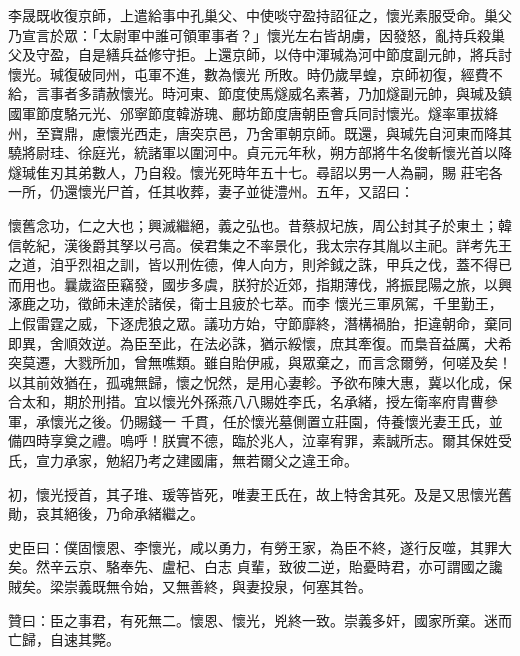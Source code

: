 \begin{pinyinscope}
 李晟既收復京師，上遣給事中孔巢父、中使啖守盈持詔征之，懷光素服受命。巢父乃宣言於眾：「太尉軍中誰可領軍事者？」懷光左右皆胡虜，因發怒，亂持兵殺巢父及守盈，自是繕兵益修守拒。上還京師，以侍中渾瑊為河中節度副元帥，將兵討懷光。瑊復破同州，屯軍不進，數為懷光
 所敗。時仍歲旱蝗，京師初復，經費不給，言事者多請赦懷光。時河東、節度使馬燧威名素著，乃加燧副元帥，與瑊及鎮國軍節度駱元光、邠寧節度韓游瑰、鄜坊節度唐朝臣會兵同討懷光。燧率軍拔絳州，至寶鼎，慮懷光西走，唐突京邑，乃舍軍朝京師。既還，與瑊先自河東而降其驍將尉珪、徐庭光，統諸軍以圍河中。貞元元年秋，朔方部將牛名俊斬懷光首以降燧瑊隹刃其弟數人，乃自殺。懷光死時年五十七。尋詔以男一人為嗣，賜
 莊宅各一所，仍還懷光尸首，任其收葬，妻子並徙澧州。五年，又詔曰：



 懷舊念功，仁之大也；興滅繼絕，義之弘也。昔蔡叔圮族，周公封其子於東土；韓信乾紀，漢後爵其孥以弓高。侯君集之不率景化，我太宗存其胤以主祀。詳考先王之道，洎乎烈祖之訓，皆以刑佐德，俾人向方，則斧鉞之誅，甲兵之伐，蓋不得已而用也。曩歲盜臣竊發，國步多虞，朕狩於近郊，指期薄伐，將振昆陽之旅，以興涿鹿之功，徵師未達於諸侯，衛士且疲於七萃。而李
 懷光三軍夙駕，千里勤王，上假雷霆之威，下逐虎狼之眾。議功方始，守節靡終，潛構禍胎，拒違朝命，棄同即異，舍順效逆。為臣至此，在法必誅，猶示綏懷，庶其牽復。而梟音益厲，犬希突莫遷，大戮所加，曾無噍類。雖自貽伊戚，與眾棄之，而言念爾勞，何嗟及矣！以其前效猶在，孤魂無歸，懷之怳然，是用心妻軫。予欲布陳大惠，冀以化成，保合太和，期於刑措。宜以懷光外孫燕八八賜姓李氏，名承緒，授左衛率府胄曹參軍，承懷光之後。仍賜錢一
 千貫，任於懷光墓側置立莊園，侍養懷光妻王氏，並備四時享奠之禮。嗚呼！朕實不德，臨於兆人，泣辜宥罪，素誠所志。爾其保姓受氏，宣力承家，勉紹乃考之建國庸，無若爾父之違王命。



 初，懷光授首，其子琟、瑗等皆死，唯妻王氏在，故上特舍其死。及是又思懷光舊勛，哀其絕後，乃命承緒繼之。



 史臣曰：僕固懷恩、李懷光，咸以勇力，有勞王家，為臣不終，遂行反噬，其罪大矣。然辛云京、駱奉先、盧杞、白志
 貞輩，致彼二逆，貽憂時君，亦可謂國之讒賊矣。梁崇義既無令始，又無善終，與妻投泉，何塞其咎。



 贊曰：臣之事君，有死無二。懷恩、懷光，兇終一致。崇義多奸，國家所棄。迷而亡歸，自速其斃。



\end{pinyinscope}